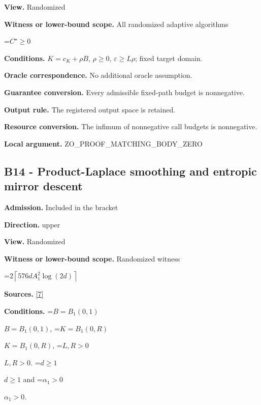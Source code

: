 \documentclass[10pt,a4paper]{article}
\newcommand{\AtlasMath}[1]{\par\begingroup\centering\setbox0=\hbox{$\displaystyle #1$}\ifdim\wd0>1.4\linewidth\typeout{ATLAS WIDE FORMULA: \the\wd0}\fi\ifdim\wd0>\linewidth\resizebox{\linewidth}{!}{\box0}\else\box0\fi\par\endgroup}
\newcommand{\AtlasInlineMath}[1]{\begingroup\setbox0=\hbox{$#1$}\ifdim\wd0>.4\linewidth\endgroup\AtlasMath{#1}\else\endgroup$#1$\fi}
\begin{document}
\textbf{View.} Randomized



\textbf{Witness or lower-bound scope.} All randomized adaptive algorithms



\AtlasMath{C^\star\ge0}


\textbf{Conditions.} $K=c_K+\rho B$, $\rho \ge 0$, $\varepsilon \ge L\rho$; fixed target domain.



\textbf{Oracle correspondence.} No additional oracle assumption.



\textbf{Guarantee conversion.} Every admissible fixed-path budget is nonnegative.



\textbf{Output rule.} The registered output space is retained.



\textbf{Resource conversion.} The infimum of nonnegative call budgets is nonnegative.



\textbf{Local argument.} ZO\_PROOF\_MATCHING\_BODY\_ZERO



\subsection{B14 - Product-Laplace smoothing and entropic mirror descent}


\textbf{Admission.} Included in the bracket



\textbf{Direction.} upper



\textbf{View.} Randomized



\textbf{Witness or lower-bound scope.} Randomized witness



\AtlasMath{2\left\lceil576dA_1^2\log(2d)\right\rceil}


\textbf{Sources.} \href{https://github.com/WU-Wendao/Colombo/blob/main/colombo_sensorium/Complexity_altas/data/sources/colombo/COLOMBO_KIMI_001/kimi_001.pdf}{[7]}



\textbf{Conditions.} \AtlasInlineMath{B=B_1(0,1)}, \AtlasInlineMath{K=B_1(0,R)}, \AtlasInlineMath{L,R>0}. \AtlasInlineMath{d\ge1} and \AtlasInlineMath{\alpha_1>0}.
\end{document}
